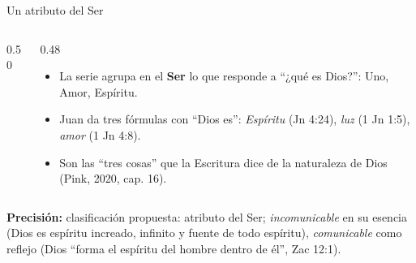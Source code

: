 \documentclass[hyperref={bookmarks=false},aspectratio=169]{beamer}
\newcommand{\destacar}[1]{\textbf{\textcolor{azul}{#1}}}
\newcommand{\precision}[1]{{\footnotesize\color{gris}\textbf{Precisión:} #1}}
\begin{document}
\begin{frame}{Un atributo del Ser}
\begin{columns}[c,onlytextwidth]
\begin{column}{0.50\textwidth}
\centering
{}
\end{column}
\begin{column}{0.48\textwidth}\small
\begin{itemize}
\item La serie agrupa en el \destacar{Ser} lo que responde a ``¿qué es Dios?'': Uno, Amor, Espíritu.
\item Juan da tres fórmulas con ``Dios es'': \emph{Espíritu} (Jn 4:24), \emph{luz} (1 Jn 1:5), \emph{amor} (1 Jn 4:8).
\item Son las ``tres cosas'' que la Escritura dice de la naturaleza de Dios (Pink, 2020, cap. 16).
\end{itemize}
\end{column}
\end{columns}\par\smallskip
\precision{clasificación propuesta: atributo del Ser; \emph{incomunicable} en su esencia (Dios es espíritu increado, infinito y fuente de todo espíritu), \emph{comunicable} como reflejo (Dios ``forma el espíritu del hombre dentro de él'', Zac 12:1).}
\end{frame}
\end{document}
